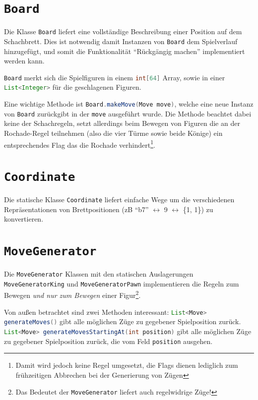 \documentclass{scrreprt}
\newcommand{\lstinlinejava}[1]{\lstinline[language=java]{#1}}
\newcommand{\lstj}[1]{\lstinlinejava{#1}}
\begin{document}
\section{\lstj{Board}}

Die Klasse \lstinlinejava{Board} liefert eine vollständige Beschreibung einer Position auf dem Schachbrett. Dies ist notwendig damit Instanzen von \lstj{Board} dem Spielverlauf hinzugefügt, und somit die Funktionalität ``Rückgängig machen'' implementiert werden kann.

\lstinlinejava{Board} merkt sich die Spielfiguren in einem \lstinlinejava{int[64]} Array, sowie in einer \lstinlinejava{List<Integer>} für die geschlagenen Figuren.

Eine wichtige Methode ist \lstj{Board.makeMove(Move move)}, welche eine neue Instanz von \lstj{Board} zurückgibt in der \lstj{move} ausgeführt wurde. Die Methode beachtet dabei keine der Schachregeln, setzt allerdings beim Bewegen von Figuren die an der Rochade-Regel teilnehmen (also die vier Türme sowie beide Könige) ein entsprechendes Flag das die Rochade verhindert\footnote{Damit wird jedoch keine Regel umgesetzt, die Flags dienen lediglich zum frühzeitigen Abbrechen bei der Generierung von Zügen}.


\section{\lstj{Coordinate}}
Die statische Klasse \lstj{Coordinate} liefert einfache Wege um die verschiedenen Repräsentationen von Brettpositionen (zB ``b7'' $\leftrightarrow$ 9 $\leftrightarrow$ \{1, 1\}) zu konvertieren.


\section{\lstj{MoveGenerator}}
Die \lstj{MoveGenerator} Klassen mit den statischen Auslagerungen \lstj{MoveGeneratorKing} und \lstj{MoveGeneratorPawn} implementieren die Regeln zum Bewegen \emph{und nur zum Bewegen} einer Figur\footnote{Das Bedeutet der \lstj{MoveGenerator} liefert auch regelwidrige Züge!}.

Von außen betrachtet sind zwei Methoden interessant:
\newline
\lstj{List<Move> generateMoves()}
\newline
gibt alle möglichen Züge zu gegebener Spielposition zurück.
\newline
\lstj{List<Move> generateMovesStartingAt(int position)}
\newline
gibt alle möglichen Züge zu gegebener Spielposition zurück, die vom Feld \lstj{position} ausgehen.
\end{document}
